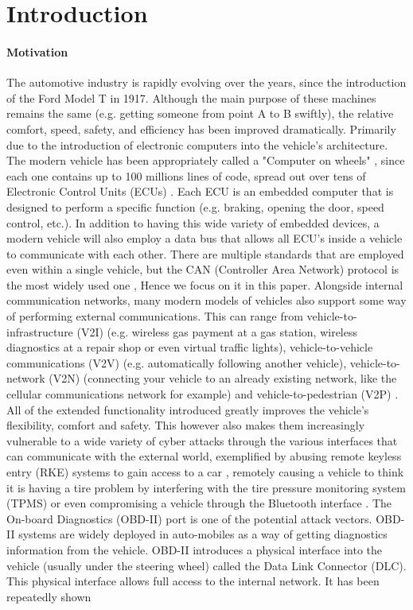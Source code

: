 \documentclass[11pt]{article}
\begin{document}
\newpage
\tableofcontents

\section{Introduction}
\label{sec:introduction}


\paragraph{Motivation}
The automotive industry is rapidly evolving over the years, since the introduction of the Ford Model T in 1917. Although the main purpose of these machines remains the same (e.g. getting someone from point A to B swiftly), the relative comfort, speed, safety, and efficiency has been improved dramatically. Primarily due to the introduction of electronic computers into the vehicle's architecture. The modern vehicle has been appropriately called a "Computer on wheels" \cite{Klinedinst05}, since each one contains up to 100 millions lines of code, spread out over tens of Electronic Control Units (ECUs) \cite{Pike15}. Each ECU is an embedded computer that is designed to perform a specific function (e.g. braking, opening the door, speed control, etc.). In addition to having this wide variety of embedded devices, a modern vehicle will also employ a data bus that allows all ECU’s inside a vehicle to communicate with each other. There are multiple standards that are employed even within a single vehicle, but the CAN (Controller Area Network) protocol is the most widely used one \cite{VatiCAN}, Hence we focus on it in this paper. Alongside internal communication networks, many modern models of vehicles also support some way of performing external communications. This can range from vehicle-to-infrastructure (V2I) (e.g. wireless gas payment at a gas station, wireless diagnostics at a repair shop or even virtual traffic lights), vehicle-to-vehicle communications (V2V) (e.g. automatically following another vehicle), vehicle-to-network (V2N) (connecting your vehicle to an already existing network, like the cellular communications network for example) and vehicle-to-pedestrian (V2P) \cite{Kleberger15}\cite{Russel17}\cite{Ahmed}. All of the extended functionality introduced greatly improves the vehicle's flexibility, comfort and safety. This however also makes them increasingly vulnerable to a wide variety of cyber attacks through the various interfaces that can communicate with the external world, exemplified by abusing remote keyless entry (RKE) systems to gain access to a car \cite{KeeLoq}\cite{MillerA}, remotely causing a vehicle to think it is having a tire problem by interfering with the tire pressure monitoring system (TPMS) \cite{MillerA} or even compromising a vehicle through the Bluetooth interface \cite{Checkoway}\cite{Kosher}. The On-board Diagnostics (OBD-II) port is one of the potential attack vectors.  OBD-II systems are widely deployed in auto-mobiles as a way of getting diagnostics information from the vehicle. OBD-II introduces a physical interface into the vehicle (usually under the steering wheel) called the Data Link Connector (DLC). This physical interface allows full access to the internal network. It has been repeatedly shown 
\end{document}
